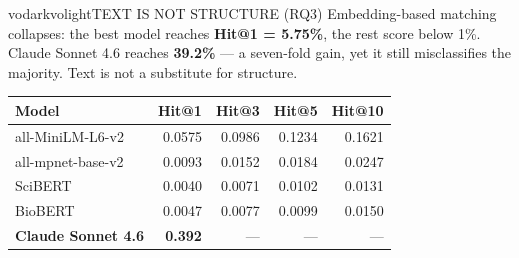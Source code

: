 \documentclass[final]{beamer}
\newlength{\colh}
\newcommand{\figcap}[1]{\vspace{2mm}{\footnotesize\itshape #1}\vspace{2mm}}
\begin{document}
\begin{frame}[t]
\begin{columns}[t,onlytextwidth]
\begin{column}{0.315\textwidth}
\begin{minipage}[t][\colh][s]{\linewidth}
                    \begin{pbox}{vodark}{volight}{TEXT IS NOT STRUCTURE (RQ3)}
                        \justifying
                        Embedding-based matching collapses: the best model reaches \textbf{Hit@1 =
                        5.75\%}, the rest score below 1\%. Claude Sonnet 4.6 reaches \textbf{39.2\%}
                        --- a seven-fold gain, yet it still misclassifies the majority. Text is not a
                        substitute for structure.
                    \end{pbox}
                        {\centering\footnotesize
                    \begin{tabular}{@{}l r r r r@{}}
                        \toprule
                        \textbf{Model} & \textbf{Hit@1} & \textbf{Hit@3} & \textbf{Hit@5} & \textbf{Hit@10}\\
                        \midrule
                        all-MiniLM-L6-v2   & 0.0575 & 0.0986 & 0.1234 & 0.1621\\
                        all-mpnet-base-v2  & 0.0093 & 0.0152 & 0.0184 & 0.0247\\
                        SciBERT            & 0.0040 & 0.0071 & 0.0102 & 0.0131\\
                        BioBERT            & 0.0047 & 0.0077 & 0.0099 & 0.0150\\
                        \textbf{Claude Sonnet 4.6} & \textbf{0.392} & --- & --- & ---\\
                        \bottomrule
                    \end{tabular}\par}
                    \figcap{ChemOnt classification, direct-parent level. Only Hit@1 is comparable
                    across rows; ground truth is 28,204 ClassyFire assignments.}


                \end{minipage}
            \end{column}


\end{columns}
\end{frame}
\end{document}
